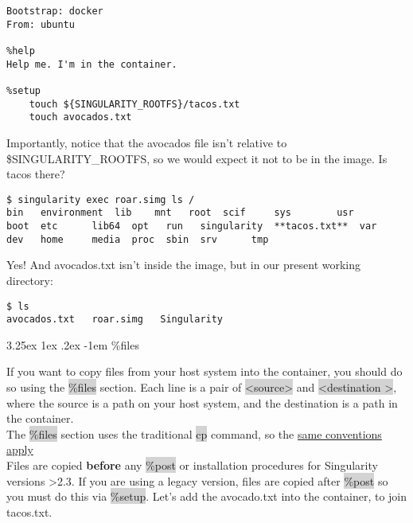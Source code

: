 \documentclass[a4paper]{article}
\makeatletter
\renewcommand\paragraph{\@startsection{paragraph}{5}{\z@}%
  {3.25ex \@plus1ex \@minus.2ex}%
  {-1em}%
  {\normalfont\normalsize\bfseries}}
\makeatother
\begin{document}
\begin{lstlisting}[frame=single]  
Bootstrap: docker
From: ubuntu

%help
Help me. I'm in the container.

%setup
    touch ${SINGULARITY_ROOTFS}/tacos.txt
    touch avocados.txt
\end{lstlisting}

Importantly, notice that the avocados file isn’t relative to \$SINGULARITY\_ROOTFS, so we would expect it not to be in the image. Is tacos there?

\begin{lstlisting}[frame=single]  
$ singularity exec roar.simg ls /
bin   environment  lib	  mnt	root  scif	   sys	      usr
boot  etc	   lib64  opt	run   singularity  **tacos.txt**  var
dev   home	   media  proc	sbin  srv	   tmp
\end{lstlisting}

Yes! And avocados.txt isn’t inside the image, but in our present working directory:

\begin{lstlisting}[frame=single]  
$ ls
avocados.txt   roar.simg   Singularity
\end{lstlisting}

\paragraph{\%files}
		
If you want to copy files from your host system into the container, you should do so using the  \colorbox{lightgray}{\%files} section. Each line is a pair of  \colorbox{lightgray}{\textless source\textgreater}  and  \colorbox{lightgray}{\textless destination \textgreater}, where the source is a path on your host system, and the destination is a path in the container.\\[0.1in]

The \colorbox{lightgray}{\%files} section uses the traditional  \colorbox{lightgray}{cp} command, so the \href{https://linux.die.net/man/1/cp}{same conventions apply}\\[0.1in]

Files are copied \textbf{before} any \colorbox{lightgray}{\%post} or installation procedures for Singularity versions \textgreater 2.3. If you are using a legacy version, files are copied after \colorbox{lightgray}{\%post} so you must do this via \colorbox{lightgray}{\%setup}. Let’s add the avocado.txt into the container, to join tacos.txt.\\[0.1in]
\end{document}
